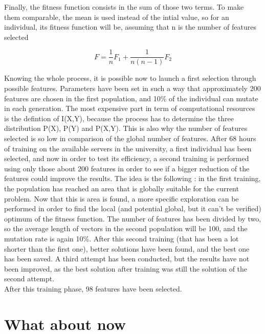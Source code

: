 \documentclass{report}
\begin{document}
	Finally, the fitness function consists in the sum of those two terms. To make them comparable, the mean is used instead of the intial value, so for an individual, its fitness function will be, assuming that n is the number of features selected
	
	\vspace{0.3cm}
	\begin{equation}
	F = \frac{1}{n}F_1 + \frac{1}{n(n-1)}F_2
	\end{equation}
	\vspace{0.3cm}
	
	Knowing the whole process, it is possible now to launch a first selection through possible features. Parameters have been set in such a way that approximately 200 features are chosen in the first population, and 10\% of the individual can mutate in each generation. The most expensive part in term of computational resources is the defintion of I(X,Y), because the process has to determine the three distribution P(X), P(Y) and P(X,Y). This is also why the number of features selected is so low in comparison of the global number of features. After 68 hours of training on the available servers in the university, a first individual has been selected, and now in order to test its efficiency, a second training is performed using only those about 200 features in order to see if a bigger reduction of the features could improve the results. The idea is the following : in the first training, the population has reached an area that is globally suitable for the current problem. Now that this is area is found, a more specific exploration can be performed in order to find the local (and potential global, but it can't be verified) optimum of the fitness function. The number of features has been divided by two, so the average length of vectors in the second population will be 100, and the mutation rate is again 10\%. After this second training (that has been a lot shorter than the first one), better solutions have been found, and the best one has been saved. A third attempt has been conducted, but the results have not been improved, as the best solution after training was still the solution of the second attempt.\\
	
	After this training phase, 98 features have been selected.
	
	\section{What about now}
	
\end{document}
